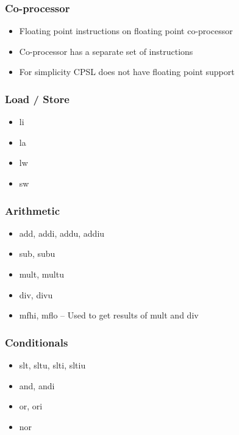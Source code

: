 \documentclass[usepdftitle=false,professionalfonts,compress ]{beamer}
\begin{document}
{
\begin{frame}\frametitle{Co-processor}

	\begin{itemize}
	\item Floating point instructions on floating point co-processor
			\item Co-processor has a separate set of instructions
			\item For simplicity CPSL does not have floating point support
				\end{itemize}

\end{frame}}





{
\begin{frame}\frametitle{Load / Store}

	\begin{itemize}
	\item li
			\item la
			\item lw
			\item sw
				\end{itemize}

\end{frame}}






{
\begin{frame}\frametitle{Arithmetic}

	\begin{itemize}
	\item add, addi, addu, addiu
			\item sub, subu
			\item mult, multu
			\item div, divu
			\item mfhi, mflo -- Used to get results of mult and div
				\end{itemize}

\end{frame}}







{
\begin{frame}\frametitle{Conditionals}

	\begin{itemize}
	\item slt, sltu, slti, sltiu
			\item and, andi
			\item or, ori
			\item nor
				\end{itemize}

\end{frame}}
\end{document}
